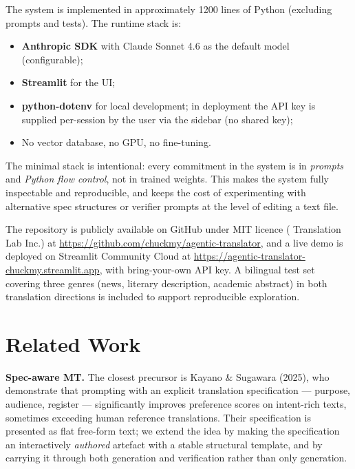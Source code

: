 \documentclass[11pt]{article}
\begin{document}
The system is implemented in approximately 1200 lines of Python (excluding prompts and tests). The runtime stack is:

\begin{itemize}[leftmargin=*]
\item \textbf{Anthropic SDK} with Claude Sonnet 4.6 as the default model (configurable);
\item \textbf{Streamlit} for the UI;
\item \textbf{python-dotenv} for local development; in deployment the API key is supplied per-session by the user via the sidebar (no shared key);
\item No vector database, no GPU, no fine-tuning.
\end{itemize}

The minimal stack is intentional: every commitment in the system is in \emph{prompts} and \emph{Python flow control}, not in trained weights. This makes the system fully inspectable and reproducible, and keeps the cost of experimenting with alternative spec structures or verifier prompts at the level of editing a text file.

The repository is publicly available on GitHub under MIT licence (\textcopyright{} Translation Lab Inc.) at \url{https://github.com/chuckmy/agentic-translator}, and a live demo is deployed on Streamlit Community Cloud at \url{https://agentic-translator-chuckmy.streamlit.app}, with bring-your-own API key. A bilingual test set covering three genres (news, literary description, academic abstract) in both translation directions is included to support reproducible exploration.

\section{Related Work}

\textbf{Spec-aware MT.} The closest precursor is Kayano \& Sugawara (2025), who demonstrate that prompting with an explicit translation specification --- purpose, audience, register --- significantly improves preference scores on intent-rich texts, sometimes exceeding human reference translations. Their specification is presented as flat free-form text; we extend the idea by making the specification an interactively \emph{authored} artefact with a stable structural template, and by carrying it through both generation and verification rather than only generation.
\end{document}
